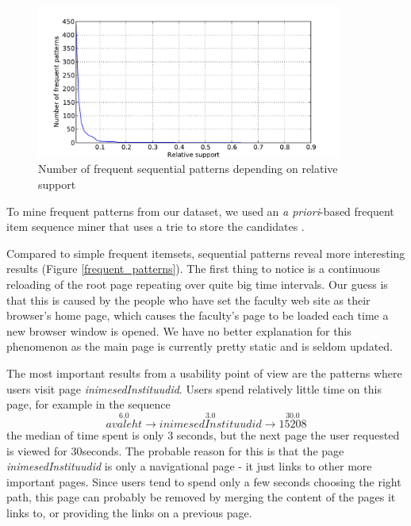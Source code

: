 \documentclass[12pt, english,a4paper]{article}
\begin{document}
\begin{figure}[H]
  \centering
      \includegraphics[width=0.9\textwidth]{sequential_itemset_count}
  \caption{Number of frequent sequential patterns depending on relative support}
\end{figure}


To mine frequent patterns from our dataset, we used an \emph{a priori}-based frequent item sequence miner that uses a trie to store the candidates \cite{seq_apriori}.


Compared to simple frequent itemsets, sequential patterns reveal more interesting results (Figure \ref{frequent_patterns}). The first thing to notice is a continuous reloading of the root page repeating over quite big time intervals. Our guess is that this is caused by the people who have set the faculty web site as their browser's home page, which causes the faculty's page to be loaded each time a new browser window is opened. We have no better explanation for this phenomenon as the main page is currently pretty static and is seldom updated.

The most important results from a usability point of view are the patterns where users visit page \emph{inimesedInstituudid}. Users spend relatively little time on this page, for example in the sequence
\[ 
\overset{6.0}{avaleht} \rightarrow \overset{3.0}{inimesedInstituudid} \rightarrow \overset{30.0}{15208} 
\]
the median of time spent is only 3 seconds, but the next page the user requested is viewed for 30seconds. The probable reason for this is that the page \emph{inimesedInstituudid} is only a navigational page - it just links to other more important pages. Since users tend to spend only a few seconds choosing the right path, this page can probably be removed by merging the content of the pages it links to, or providing the links on a previous page.
\end{document}

